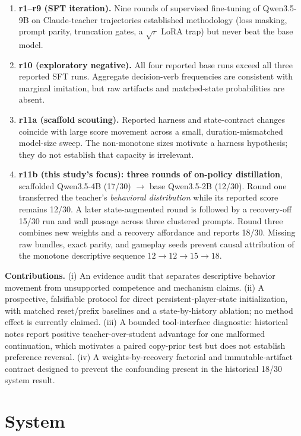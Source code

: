 \documentclass[11pt]{article}
\begin{document}
\begin{enumerate}
\item \textbf{r1--r9 (SFT iteration).} Nine rounds of supervised fine-tuning of Qwen3.5-9B on
Claude-teacher trajectories established methodology (loss masking, prompt parity,
truncation gates, a $\sqrt{r}$ LoRA trap) but never beat the base model.
\item \textbf{r10 (exploratory negative).} All four reported base runs exceed all three reported
SFT runs. Aggregate decision-verb frequencies are consistent with marginal imitation, but raw
artifacts and matched-state probabilities are absent.
\item \textbf{r11a (scaffold scouting).} Reported harness and state-contract changes coincide with
large score movement across a small, duration-mismatched model-size sweep. The non-monotone sizes
motivate a harness hypothesis; they do not establish that capacity is irrelevant.
\item \textbf{r11b (this study's focus): three rounds of on-policy distillation}, scaffolded
Qwen3.5-4B (17/30) $\rightarrow$ base Qwen3.5-2B (12/30). Round one transferred the teacher's
\emph{behavioral distribution} while its reported score remains 12/30. A later state-augmented
round is followed by a recovery-off 15/30 run and wall passage across three clustered prompts.
Round three combines new weights and a recovery affordance and reports 18/30. Missing raw bundles,
exact parity, and gameplay seeds prevent causal attribution of the monotone descriptive sequence
$12 \rightarrow 12 \rightarrow 15 \rightarrow 18$.
\end{enumerate}

\textbf{Contributions.} (i) An evidence audit that separates descriptive behavior movement from
unsupported competence and mechanism claims. (ii) A prospective, falsifiable protocol for direct
persistent-player-state initialization, with matched reset/prefix baselines and a state-by-history
ablation; no method effect is currently claimed. (iii) A bounded tool-interface diagnostic:
historical notes report positive teacher-over-student advantage for one malformed continuation,
which motivates a paired copy-prior test but does not establish preference reversal. (iv) A
weights-by-recovery factorial and immutable-artifact contract designed to prevent the confounding
present in the historical 18/30 system result.

\section{System}
\end{document}

